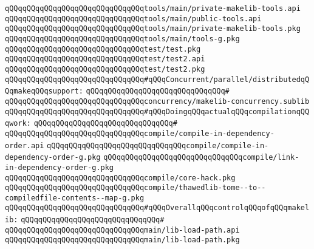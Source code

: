 \verb|qQQqqQQqqQQqqQQqqQQqqQQqqQQqqQQqtools/main/private-makelib-tools.api|\newline
\verb|qQQqqQQqqQQqqQQqqQQqqQQqqQQqqQQqtools/main/public-tools.api|\newline
\verb|qQQqqQQqqQQqqQQqqQQqqQQqqQQqqQQqtools/main/private-makelib-tools.pkg|\newline
\verb|qQQqqQQqqQQqqQQqqQQqqQQqqQQqqQQqtools/main/tools-g.pkg|\newline
\newline
\verb|qQQqqQQqqQQqqQQqqQQqqQQqqQQqqQQqtest/test.pkg|\newline
\verb|qQQqqQQqqQQqqQQqqQQqqQQqqQQqqQQqtest/test2.api|\newline
\verb|qQQqqQQqqQQqqQQqqQQqqQQqqQQqqQQqtest/test2.pkg|\newline
\newline
\verb|qQQqqQQqqQQqqQQqqQQqqQQqqQQqqQQq#qQQqConcurrent/parallel/distributedqQQqmakeqQQqsupport:|\newline
\verb|qQQqqQQqqQQqqQQqqQQqqQQqqQQqqQQq#|\newline
\verb|qQQqqQQqqQQqqQQqqQQqqQQqqQQqqQQqconcurrency/makelib-concurrency.sublib|\newline
\newline
\verb|qQQqqQQqqQQqqQQqqQQqqQQqqQQqqQQq#qQQqDoingqQQqactualqQQqcompilationqQQqwork:|\newline
\verb|qQQqqQQqqQQqqQQqqQQqqQQqqQQqqQQq#|\newline
\verb|qQQqqQQqqQQqqQQqqQQqqQQqqQQqqQQqcompile/compile-in-dependency-order.api|\newline
\verb|qQQqqQQqqQQqqQQqqQQqqQQqqQQqqQQqcompile/compile-in-dependency-order-g.pkg|\newline
\verb|qQQqqQQqqQQqqQQqqQQqqQQqqQQqqQQqcompile/link-in-dependency-order-g.pkg|\newline
\verb|qQQqqQQqqQQqqQQqqQQqqQQqqQQqqQQqcompile/core-hack.pkg|\newline
\verb|qQQqqQQqqQQqqQQqqQQqqQQqqQQqqQQqcompile/thawedlib-tome--to--compiledfile-contents--map-g.pkg|\newline
\newline
\verb|qQQqqQQqqQQqqQQqqQQqqQQqqQQqqQQq#qQQqOverallqQQqcontrolqQQqofqQQqmakelib:|\newline
\verb|qQQqqQQqqQQqqQQqqQQqqQQqqQQqqQQq#|\newline
\verb|qQQqqQQqqQQqqQQqqQQqqQQqqQQqqQQqmain/lib-load-path.api|\newline
\verb|qQQqqQQqqQQqqQQqqQQqqQQqqQQqqQQqmain/lib-load-path.pkg|\newline
